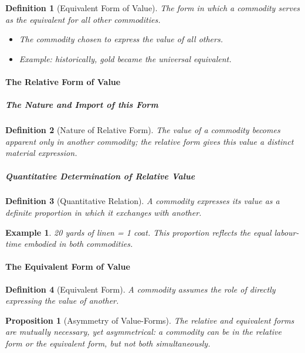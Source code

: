\documentclass{article}
\newtheorem{innerdef}{Definition}
\newtheorem{innerprop}{Proposition}
\newtheorem{innerex}{Example}
\newenvironment{definition}{\begin{innerdef}}{\end{innerdef}}
\newenvironment{proposition}{\begin{innerprop}}{\end{innerprop}}
\newenvironment{example}{\begin{innerex}}{\end{innerex}}
\begin{document}
\begin{definition}[Equivalent Form of Value]
The form in which a commodity serves as the equivalent for all other commodities.
\begin{itemize}[noitemsep]
    \item The commodity chosen to express the value of all others.
    \item Example: historically, gold became the universal equivalent.
\end{itemize}
\end{definition}


\paragraph{The Relative Form of Value} %

\subparagraph{The Nature and Import of this Form} %

\begin{definition}[Nature of Relative Form]
The value of a commodity becomes apparent only in another commodity; the relative form gives this value a distinct material expression.
\end{definition}

\subparagraph{Quantitative Determination of Relative Value} %

\begin{definition}[Quantitative Relation]
A commodity expresses its value as a definite proportion in which it exchanges with another.
\end{definition}

\begin{example}
20 yards of linen = 1 coat.  
This proportion reflects the equal labour-time embodied in both commodities.
\end{example}

\paragraph{The Equivalent Form of Value} %

\begin{definition}[Equivalent Form]
A commodity assumes the role of directly expressing the value of another.
\end{definition}

\begin{proposition}[Asymmetry of Value-Forms]
The relative and equivalent forms are mutually necessary, yet asymmetrical: 
a commodity can be in the relative form or the equivalent form, but not both simultaneously.
\end{proposition}
\end{document}
